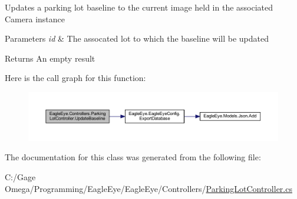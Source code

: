 Updates a parking lot baseline to the current image held in the associated Camera instance 


\begin{DoxyParams}{Parameters}
{\em id} & The assocated lot to which the baseline will be updated\\
\hline
\end{DoxyParams}
\begin{DoxyReturn}{Returns}
An empty result
\end{DoxyReturn}
Here is the call graph for this function\+:\nopagebreak
\begin{figure}[H]
\begin{center}
\leavevmode
\includegraphics[width=350pt]{class_eagle_eye_1_1_controllers_1_1_parking_lot_controller_a073d77794ca654b813b37deae908501a_cgraph}
\end{center}
\end{figure}


The documentation for this class was generated from the following file\+:\begin{DoxyCompactItemize}
\item 
C\+:/\+Gage Omega/\+Programming/\+Eagle\+Eye/\+Eagle\+Eye/\+Controllers/\mbox{\hyperlink{_parking_lot_controller_8cs}{Parking\+Lot\+Controller.\+cs}}\end{DoxyCompactItemize}
